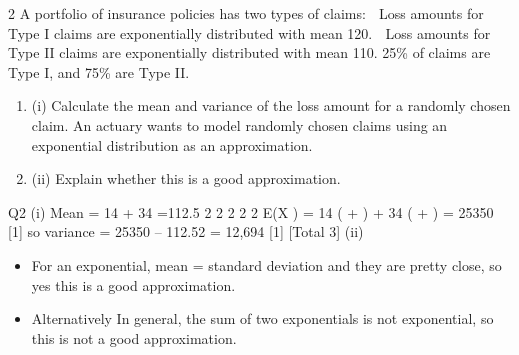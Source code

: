 \documentclass[a4paper,12pt]{article}
\begin{document}
  2 A portfolio of insurance policies has two types of claims:
   Loss amounts for Type I claims are exponentially distributed with mean 120.
 Loss amounts for Type II claims are exponentially distributed with mean 110.
25\% of claims are Type I, and 75\% are Type II.
\begin{enumerate}
\item (i) Calculate the mean and variance of the loss amount for a randomly chosen claim.
An actuary wants to model randomly chosen claims using an exponential distribution as an approximation.
\item (ii) Explain whether this is a good approximation.
\end{enumerate}

\newpage

Q2 (i) Mean = 14  + 34  =112.5
2 2 2 2 2
E(X ) = 14 ( +  ) + 34 ( +  ) = 25350 [1]
so variance = 25350 – 112.52 = 12,694 [1]
[Total 3]
(ii) 
\begin{itemize}
\item For an exponential, mean = standard deviation and they are pretty close, so yes
this is a good approximation. 
\item Alternatively
In general, the sum of two exponentials is not exponential, so this is not a
good approximation. 
\end{itemize}
\end{document}
